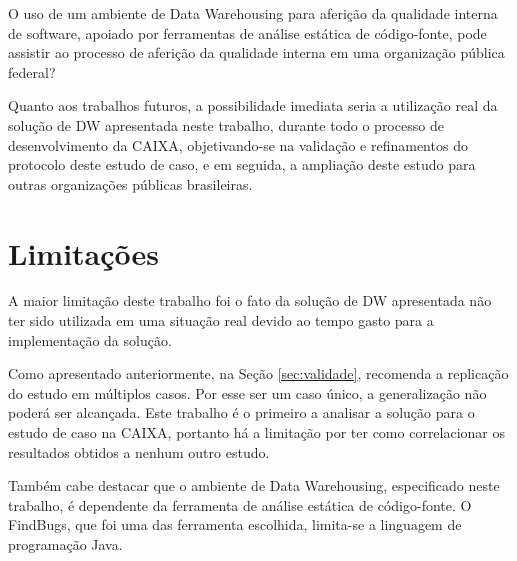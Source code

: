 O uso de um ambiente de Data Warehousing para aferição da qualidade interna de software, apoiado por ferramentas de análise estática de
código-fonte, pode assistir ao processo de aferição da qualidade interna em
uma organização pública federal?





Quanto aos trabalhos futuros, a possibilidade imediata seria a utilização real da solução de DW apresentada neste trabalho, durante todo o processo de desenvolvimento da CAIXA, objetivando-se na validação e refinamentos do protocolo deste estudo de caso, e em seguida, a ampliação deste estudo para outras organizações públicas brasileiras.  

\section{Limitações}

A maior limitação deste trabalho foi o fato da solução de DW apresentada não ter sido utilizada em uma situação real devido ao tempo gasto para a implementação da solução. 

Como apresentado anteriormente, na Seção \ref{sec:validade},  recomenda a replicação do estudo em múltiplos casos. Por esse ser um caso único, a generalização não poderá ser alcançada. Este trabalho é o primeiro a analisar a solução para o estudo de caso na CAIXA, portanto há a limitação por ter como correlacionar os resultados obtidos a nenhum outro estudo.

Também cabe destacar que o ambiente de Data Warehousing, especificado neste trabalho, é dependente da ferramenta de análise estática de código-fonte. O FindBugs, que foi uma das ferramenta escolhida, limita-se a linguagem de programação Java.




